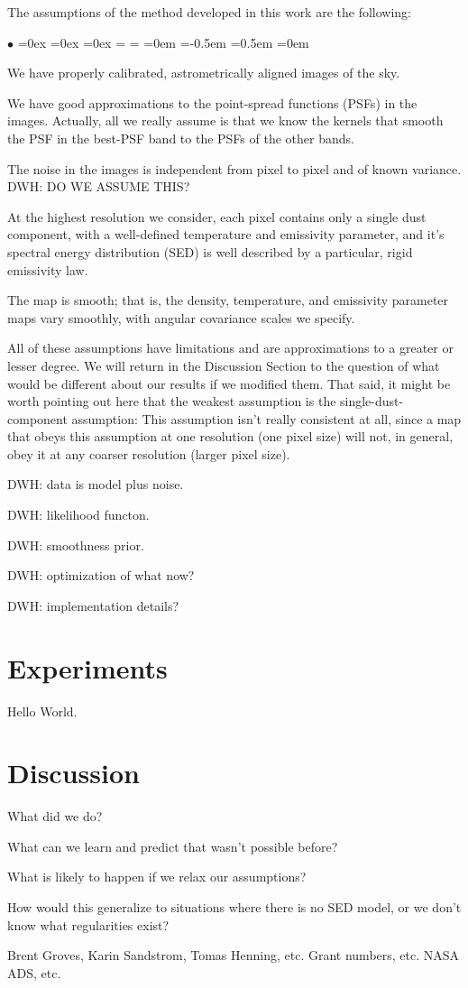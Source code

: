 \documentclass[12pt, preprint]{aastex}
\newenvironment{hoggitemize}{\begin{list}{$\bullet$}{%
\topsep=0ex
\partopsep=0ex
\itemsep=0.5\parskip
\parsep=0ex
\leftmargin=\parindent
\rightmargin=\parindent
\listparindent=0em
\itemindent=-0.5em
\labelsep=0.5em
\labelwidth=0em}}{\end{list}}
\newcommand{\acronym}[1]{{\small{#1}}}
\begin{document}
The assumptions of the method developed in this work are the
following:
\begin{hoggitemize}
\item We have properly calibrated, astrometrically aligned images of
  the sky.
\item We have good approximations to the point-spread functions (PSFs)
  in the images.  Actually, all we really assume is that we know the
  kernels that smooth the PSF in the best-PSF band to the PSFs of the
  other bands.
\item The noise in the images is independent from pixel to pixel and
  of known variance. DWH: DO WE ASSUME THIS?
\item At the highest resolution we consider, each pixel contains only
  a single dust component, with a well-defined temperature and
  emissivity parameter, and it's spectral energy distribution (SED)
  is well described by a particular, rigid emissivity law.
\item The map is smooth; that is, the density, temperature, and
  emissivity parameter maps vary smoothly, with angular covariance
  scales we specify.
\end{hoggitemize}
All of these assumptions have limitations and are approximations to a
greater or lesser degree.
We will return in the Discussion Section to the question of what would
be different about our results if we modified them.
That said, it might be worth pointing out here that the weakest
assumption is the single-dust-component assumption:
This assumption isn't really consistent at all, since a map that obeys
this assumption at one resolution (one pixel size) will not, in
general, obey it at any coarser resolution (larger pixel size).

DWH: data is model plus noise.

DWH: likelihood functon.

DWH: smoothness prior.

DWH: optimization of what now?

DWH: implementation details?

\section{Experiments}

Hello World.

\section{Discussion}

What did we do?

What can we learn and predict that wasn't possible before?

What is likely to happen if we relax our assumptions?

How would this generalize to situations where there is no SED model,
or we don't know what regularities exist?

\acknowledgements
Brent Groves, Karin Sandstrom, Tomas Henning, etc.
Grant numbers, etc.
\acronym{NASA ADS}, etc.
\end{document}
